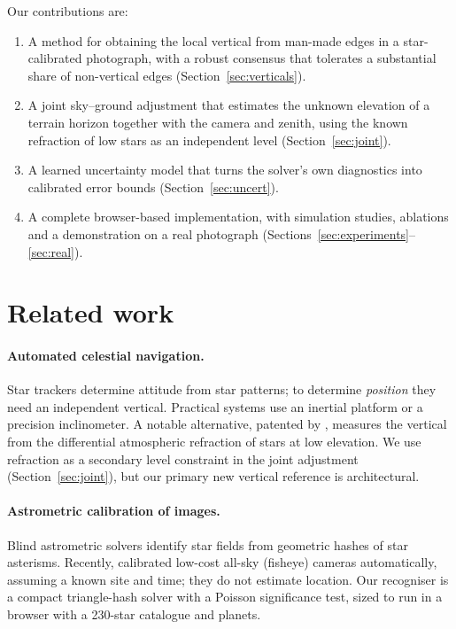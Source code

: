 \documentclass[11pt,a4paper]{article}
\begin{document}
Our contributions are:
\begin{enumerate}\itemsep0pt
\item A method for obtaining the local vertical from man-made edges in a star-calibrated photograph, with a robust consensus that tolerates a substantial share of non-vertical edges (Section~\ref{sec:verticals}).
\item A joint sky--ground adjustment that estimates the unknown elevation of a terrain horizon together with the camera and zenith, using the known refraction of low stars as an independent level (Section~\ref{sec:joint}).
\item A learned uncertainty model that turns the solver's own diagnostics into calibrated error bounds (Section~\ref{sec:uncert}).
\item A complete browser-based implementation, with simulation studies, ablations and a demonstration on a real photograph (Sections~\ref{sec:experiments}--\ref{sec:real}).
\end{enumerate}

\section{Related work}

\paragraph{Automated celestial navigation.} Star trackers determine attitude from star patterns; to determine \emph{position} they need an independent vertical. Practical systems use an inertial platform or a precision inclinometer. A notable alternative, patented by \citet{rosenwinkel2014patent}, measures the vertical from the differential atmospheric refraction of stars at low elevation. We use refraction as a secondary level constraint in the joint adjustment (Section~\ref{sec:joint}), but our primary new vertical reference is architectural.

\paragraph{Astrometric calibration of images.} Blind astrometric solvers identify star fields from geometric hashes of star asterisms. Recently, \citet{gonzalez2026allsky} calibrated low-cost all-sky (fisheye) cameras automatically, assuming a known site and time; they do not estimate location. Our recogniser is a compact triangle-hash solver with a Poisson significance test, sized to run in a browser with a 230-star catalogue and planets.
\end{document}
